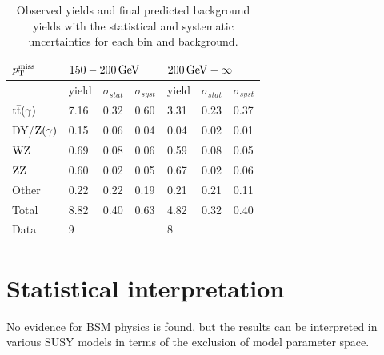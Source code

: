 \begin{table}[bpt]
 \centering
 \caption{Observed yields and final predicted background yields with the statistical and systematic uncertainties for each bin and background.}
 \normalsize
 \label{tab:results}
 \begin{tabular}{lllllll}
  $p_{\mathrm{T}}^\text{miss}$      & \multicolumn{3}{l}{$150-200\,\text{Ge\hspace{-.08em}V}$} & \multicolumn{3}{l}{$200\,\text{Ge\hspace{-.08em}V}-\infty$}                                                               \\\hline
                 & yield                             & $\sigma_{stat}$                      & $\sigma_{syst}$ & yield & $\sigma_{stat}$ & $\sigma_{syst}$ \\\hline
  ${\mathrm{t}\overline{\mathrm{t}}}(\gamma)$ & 7.16                              & 0.32                                 & 0.60            & 3.31  & 0.23            & 0.37            \\
  DY/$\mathrm{Z}(\gamma)$ & 0.15                              & 0.06                                 & 0.04            & 0.04  & 0.02            & 0.01            \\
  $\mathrm{W}\mathrm{Z}$       & 0.69                              & 0.08                                 & 0.06            & 0.59  & 0.08            & 0.05            \\
  $\mathrm{Z}\mathrm{Z}$       & 0.60                              & 0.02                                 & 0.05            & 0.67  & 0.02            & 0.06            \\
  Other          & 0.22                              & 0.22                                 & 0.19            & 0.21  & 0.21            & 0.11            \\\hline
  Total          & 8.82                              & 0.40                                 & 0.63            & 4.82  & 0.32            & 0.40            \\\hline
  Data           & 9                                 &                                      &                 & 8     &                 &                 \\\hline
 \end{tabular}
 \vspace{\baselineskip}
\end{table}


\section{Statistical interpretation}
No evidence for BSM physics is found, but the results can be interpreted in various SUSY models in terms of the exclusion of model parameter space.
